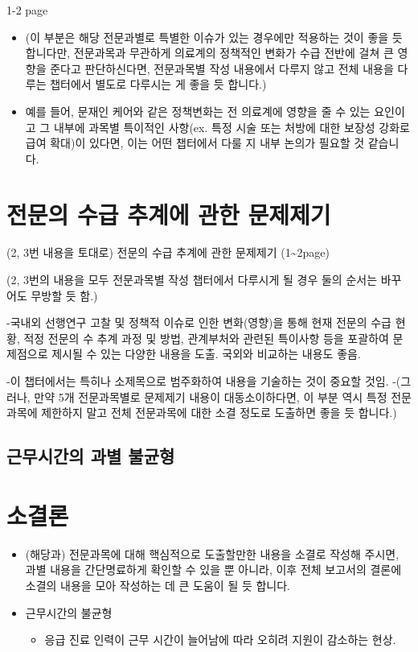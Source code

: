\documentclass[]{book}
\providecommand{\tightlist}{%
  \setlength{\itemsep}{0pt}\setlength{\parskip}{0pt}}
\begin{document}
1-2 page

\begin{itemize}
\item
  (이 부분은 해당 전문과별로 특별한 이슈가 있는 경우에만 적용하는 것이 좋을 듯 합니다만, 전문과목과 무관하게 의료계의 정책적인 변화가 수급 전반에 걸쳐 큰 영향을 준다고 판단하신다면, 전문과목별 작성 내용에서 다루지 않고 전체 내용을 다루는 챕터에서 별도로 다루시는 게 좋을 듯 합니다.)
\item
  예를 들어, 문재인 케어와 같은 정책변화는 전 의료계에 영향을 줄 수 있는 요인이고 그 내부에 과목별 특이적인 사항(ex. 특정 시술 또는 처방에 대한 보장성 강화로 급여 확대)이 있다면, 이는 어떤 챕터에서 다룰 지 내부 논의가 필요할 것 같습니다.
\end{itemize}

\hypertarget{section-10}{%
\chapter{전문의 수급 추계에 관한 문제제기}\label{section-10}}

(2, 3번 내용을 토대로) 전문의 수급 추계에 관한 문제제기 (1\textasciitilde2page)

(2, 3번의 내용을 모두 전문과목별 작성 챕터에서 다루시게 될 경우 둘의 순서는 바꾸어도 무방할 듯 함.)

-국내외 선행연구 고찰 및 정책적 이슈로 인한 변화(영향)을 통해 현재 전문의 수급 현황, 적정 전문의 수 추계 과정 및 방법, 관계부처와 관련된 특이사항 등을 포괄하여 문제점으로 제시될 수 있는 다양한 내용을 도출. 국외와 비교하는 내용도 좋음.

-이 챕터에서는 특히나 소제목으로 범주화하여 내용을 기술하는 것이 중요할 것임.
-(그러나, 만약 5개 전문과목별로 문제제기 내용이 대동소이하다면, 이 부분 역시 특정 전문과목에 제한하지 말고 전체 전문과목에 대한 소결 정도로 도출하면 좋을 듯 합니다.)

\hypertarget{section-11}{%
\section{근무시간의 과별 불균형}\label{section-11}}

\hypertarget{section-12}{%
\chapter{소결론}\label{section-12}}

\begin{itemize}
\item
  (해당과) 전문과목에 대해 핵심적으로 도출할만한 내용을 소결로 작성해 주시면, 과별 내용을 간단명료하게 확인할 수 있을 뿐 아니라, 이후 전체 보고서의 결론에 소결의 내용을 모아 작성하는 데 큰 도움이 될 듯 합니다.
\item
  근무시간의 불균형

  \begin{itemize}
  \tightlist
  \item
    응급 진료 인력이 근무 시간이 늘어남에 따라 오히려 지원이 감소하는 현상.
  \end{itemize}
\end{itemize}
\end{document}
